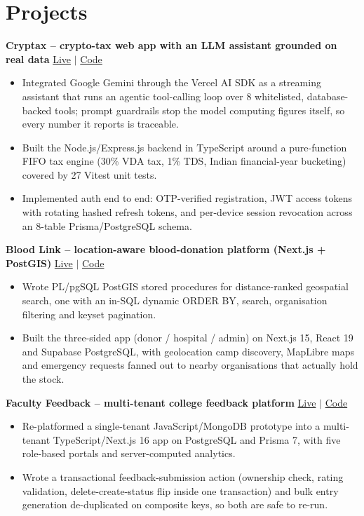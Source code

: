 \documentclass[letterpaper,10.5pt]{article}
\newcommand{\EntryLine}[2]{\textbf{#1} \hfill {\small #2}\par\vspace{-1pt}}
\newenvironment{Bullets}
  {\begin{itemize}[leftmargin=1.15em,itemsep=1pt,parsep=0pt,topsep=2pt]\small}
  {\end{itemize}\vspace{3pt}}
\begin{document}
\section{Projects}
\EntryLine{Cryptax -- crypto-tax web app with an LLM assistant grounded on real data}{\href{https://cryp1ax.vercel.app}{Live} $|$ \href{https://github.com/Agent-Gautam/buddy-backend}{Code}}
\begin{Bullets}
  \item Integrated Google Gemini through the Vercel AI SDK as a streaming assistant that runs an agentic tool-calling loop over 8 whitelisted, database-backed tools; prompt guardrails stop the model computing figures itself, so every number it reports is traceable.
  \item Built the Node.js/Express.js backend in TypeScript around a pure-function FIFO tax engine (30\% VDA tax, 1\% TDS, Indian financial-year bucketing) covered by 27 Vitest unit tests.
  \item Implemented auth end to end: OTP-verified registration, JWT access tokens with rotating hashed refresh tokens, and per-device session revocation across an 8-table Prisma/PostgreSQL schema.
\end{Bullets}

\EntryLine{Blood Link -- location-aware blood-donation platform (Next.js + PostGIS)}{\href{https://blood-link2.vercel.app}{Live} $|$ \href{https://github.com/Agent-Gautam/blood-link-supabase}{Code}}
\begin{Bullets}
  \item Wrote PL/pgSQL PostGIS stored procedures for distance-ranked geospatial search, one with an in-SQL dynamic ORDER BY, search, organisation filtering and keyset pagination.
  \item Built the three-sided app (donor / hospital / admin) on Next.js 15, React 19 and Supabase PostgreSQL, with geolocation camp discovery, MapLibre maps and emergency requests fanned out to nearby organisations that actually hold the stock.
\end{Bullets}

\EntryLine{Faculty Feedback -- multi-tenant college feedback platform}{\href{https://give-feedback.vercel.app}{Live} $|$ \href{https://github.com/Agent-Gautam/faculty-feedback-refactor}{Code}}
\begin{Bullets}
  \item Re-platformed a single-tenant JavaScript/MongoDB prototype into a multi-tenant TypeScript/Next.js 16 app on PostgreSQL and Prisma 7, with five role-based portals and server-computed analytics.
  \item Wrote a transactional feedback-submission action (ownership check, rating validation, delete-create-status flip inside one transaction) and bulk entry generation de-duplicated on composite keys, so both are safe to re-run.
\end{Bullets}
\end{document}
